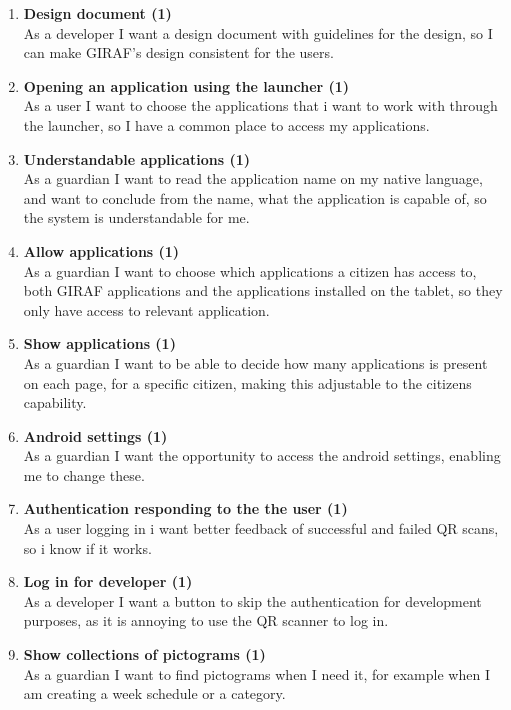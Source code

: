 \begin{enumerate}
	\setcounter{enumi}{0} %
	\item \textbf{Design document (1)}\\
	As a developer I want a design document with guidelines for the design, so I can make GIRAF's design consistent for the users.
	
	\item \textbf{Opening an application using the launcher (1)}\\
	As a user I want to choose the applications that i want to work with through the launcher, so I have a common place to access my applications.
	
	\item \textbf{Understandable applications (1)}\\
	As a guardian I want to read the application name on my native language, and want to conclude from the name, what the application is capable of, so the system is understandable for me.
	
	\item \textbf{Allow applications (1)}\\
	As a guardian I want to choose which applications a citizen has access to, both GIRAF applications and the applications installed on the tablet, so they only have access to relevant application.
	
	\item \textbf{Show applications (1)} \\
	As a guardian I want to be able to decide how many applications is present on each page, for a specific citizen, making this adjustable to the citizens capability.
	
	\item \textbf{Android settings (1)}\\
	As a guardian I want the opportunity to access the android settings, enabling me to change these. 
	
	\item \textbf{Authentication responding to the the user (1)}\\
	As a user logging in i want better feedback of successful and failed QR scans, so i know if it works.
	
	\item \textbf{Log in for developer (1)}\\
	As a developer I want a button to skip the authentication for development purposes, as it is annoying to use the QR scanner to log in.
	
	\item \textbf{Show collections of pictograms (1)}\\
	As a guardian I want to find pictograms when I need it, for example when I am creating a week schedule or a category.
\end{enumerate}

